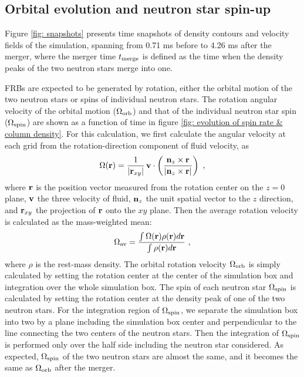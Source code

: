 \documentclass[]{pasj01}
\begin{document}
\subsection{Orbital evolution and neutron star spin-up}

Figure \ref{fig: snapshots} presents time snapshots of density
contours and velocity fields of the simulation, spanning from 0.71
ms before to 4.26 ms after the merger, where the merger time $t_{\rm
  merge}$ is defined as the time when the density peaks of the two
neutron stars merge into one.

FRBs are expected to be generated by rotation, either the orbital
motion of the two neutron stars or spins of individual neutron
stars. The rotation angular velocity of the orbital motion
($\Omega_{\rm orb}$) and that of the individual neutron star spin
($\Omega_{\rm spin}$) are shown as a function of time in figure \ref{fig: evolution of spin rate & column density}. For this
calculation, we first calculate the angular velocity at each grid
from the rotation-direction component of fluid velocity, as
\begin{eqnarray}
\Omega({ \bf r}) = \frac{1}{ | {\bf r}_{xy} | } \, 
{\bf v}  \cdot \left( \frac{ {\bf n}_z \times
{\bf r} }{ | {\bf n}_z \times {\bf r} | }
\right) \ ,
\end{eqnarray}
where ${\bf r}$ is the position vector measured from the rotation
center on the $z=0$ plane, ${\bf v}$ the three velocity of fluid,
${\bf n}_z$ the unit spatial vector to the $z$ direction, and ${\bf
  r}_{xy}$ the projection of ${\bf r}$ onto the $xy$ plane. Then the
average rotation velocity is calculated as the mass-weighted mean:
\begin{eqnarray}
\Omega_{\rm av} = \frac{\int \Omega({\bf r}) \rho({\bf r}) d{\bf r}  }{
\int \rho({\bf r}) d{\bf r} } \ ,
\end{eqnarray}
where $\rho$ is the rest-mass density.  The orbital rotation velocity
$\Omega_{\rm orb}$ is simply calculated by setting the rotation center
at the center of the simulation box and integration over the whole
simulation box. The spin of each neutron star $\Omega_{\rm spin}$ is
calculated by setting the rotation center at the density peak of one
of the two neutron stars. For the integration region of $\Omega_{\rm
  spin}$, we separate the simulation box into two by a plane including
the simulation box center and perpendicular to the line connecting the
two centers of the neutron stars. Then the integration of $\Omega_{\rm
  spin}$ is performed only over the half side including the neutron
star considered.  As expected, $\Omega_{\rm spin}$ of the two neutron
stars are almost the same, and it becomes the same as $\Omega_{\rm
  orb}$ after the merger.
\end{document}
